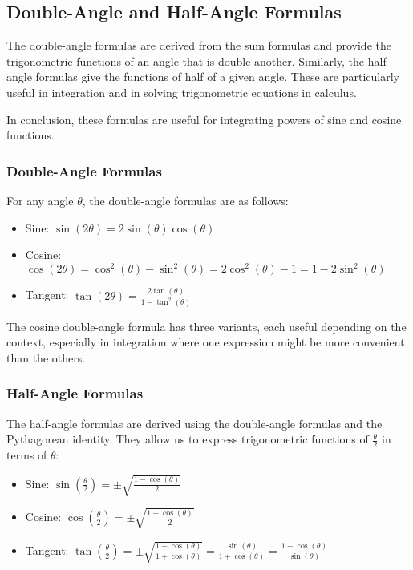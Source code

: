 \documentclass[a4paper,12pt]{book}
\begin{document}
\subsection{Double-Angle and Half-Angle Formulas}
\label{subsec:double_half_angle_formulas}

The double-angle formulas are derived from the sum formulas and provide the trigonometric functions of an angle that is double another. Similarly, the half-angle formulas give the functions of half of a given angle. These are particularly useful in integration and in solving trigonometric equations in calculus.

In conclusion, these formulas are useful for integrating powers of sine and cosine functions.

\subsubsection{Double-Angle Formulas}
\label{subsubsec:double_angle_formulas}
For any angle $\theta$, the double-angle formulas are as follows:

\begin{itemize}
    \item Sine: $\sin(2\theta) = 2\sin(\theta)\cos(\theta)$
    \item Cosine: $\cos(2\theta) = \cos^2(\theta) - \sin^2(\theta) = 2\cos^2(\theta) - 1 = 1 - 2\sin^2(\theta)$
    \item Tangent: $\tan(2\theta) = \frac{2\tan(\theta)}{1 - \tan^2(\theta)}$
\end{itemize}

The cosine double-angle formula has three variants, each useful depending on the context, especially in integration where one expression might be more convenient than the others.

\subsubsection{Half-Angle Formulas}
\label{subsubsec:half_angle_formulas}
The half-angle formulas are derived using the double-angle formulas and the Pythagorean identity. They allow us to express trigonometric functions of $\frac{\theta}{2}$ in terms of $\theta$:

\begin{itemize}
    \item Sine: $\sin\left(\frac{\theta}{2}\right) = \pm\sqrt{\frac{1 - \cos(\theta)}{2}}$
    \item Cosine: $\cos\left(\frac{\theta}{2}\right) = \pm\sqrt{\frac{1 + \cos(\theta)}{2}}$
    \item Tangent: $\tan\left(\frac{\theta}{2}\right) = \pm\sqrt{\frac{1 - \cos(\theta)}{1 + \cos(\theta)}} = \frac{\sin(\theta)}{1 + \cos(\theta)} = \frac{1 - \cos(\theta)}{\sin(\theta)}$
\end{itemize}
\end{document}
